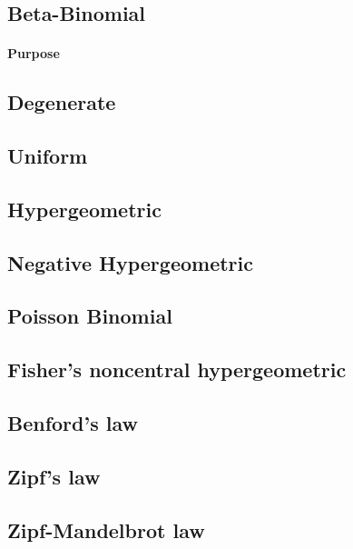 \subsection{Beta-Binomial}
\paragraph{Purpose}

\subsection{Degenerate}
\subsection{Uniform}
\subsection{Hypergeometric}
\subsection{Negative Hypergeometric}
\subsection{Poisson Binomial}
\subsection{Fisher's noncentral hypergeometric}
\subsection{Benford's law}
\subsection{Zipf's law}
\subsection{Zipf-Mandelbrot law}

